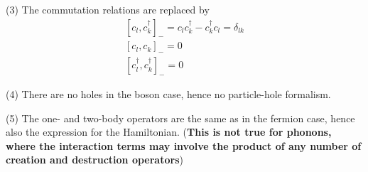(3) The commutation relations are replaced by
\begin{equation}\begin{array}{l}
{\left[c_{l}, c_{k}^{\dagger}\right]_{-}=c_{l} c_{k}^{\dagger}-c_{k}^{\dagger} c_{l}=\delta_{l k}} \\
{\left[c_{l}, c_{k}\right]_{-}=0} \\
{\left[c_{l}^{\dagger}, c_{k}^{\dagger}\right]_{-}=0}
\end{array}\end{equation}

(4) There are no holes in the boson case, hence no particle-hole formalism.

(5) The one- and two-body operators are the same as in the fermion case, hence also the expression for the Hamiltonian. (\textbf{This is not true for phonons, where the interaction terms may involve the product of any number of creation and destruction operators})